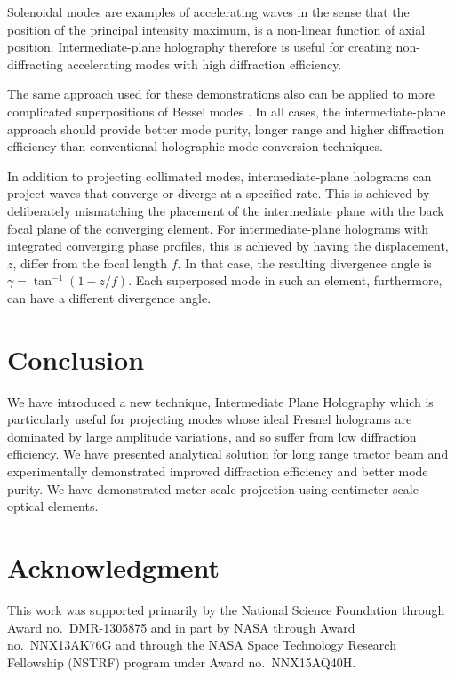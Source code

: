 Solenoidal modes are examples of accelerating waves \cite{berry79}
in the sense that the position of the principal intensity maximum,
is a non-linear function of axial position.
Intermediate-plane holography therefore is useful for creating
non-diffracting accelerating modes with high diffraction efficiency.

The same approach used for these demonstrations also can be
applied to more complicated superpositions of Bessel modes
\cite{cizmar09,vasilyeu09,lee10,litvin11}. %
In all cases, the intermediate-plane approach should provide
better mode purity, longer range and higher diffraction efficiency
than conventional holographic mode-conversion techniques.

In addition to projecting collimated modes, intermediate-plane
holograms can project waves that converge or diverge at
a specified rate.  This is achieved by deliberately mismatching
the placement of the intermediate plane with the back focal
plane of the converging element.  For intermediate-plane holograms
with integrated converging phase profiles, this is achieved by
having the displacement, $z$, differ from the focal length $f$.
In that case, the resulting divergence angle is
$\gamma = \tan^{-1}(1 - z/f)$. %
Each superposed mode in such an element, furthermore, can have
a different divergence angle.

\section{Conclusion}

We have introduced a new technique, Intermediate 
Plane Holography which is particularly useful for projecting
modes whose ideal Fresnel holograms are dominated by large
amplitude variations, and so suffer from low diffraction efficiency.
We have presented analytical solution for long range tractor beam
and experimentally demonstrated improved  diffraction efficiency
and better mode purity. We have demonstrated meter-scale 
projection using centimeter-scale optical elements. 




\section{Acknowledgment}
This work was supported primarily by the National Science Foundation
through Award no.\ DMR-1305875 and in part by NASA through
Award no.\ NNX13AK76G and through the NASA Space Technology Research
Fellowship (NSTRF) program under Award no.\ NNX15AQ40H.



